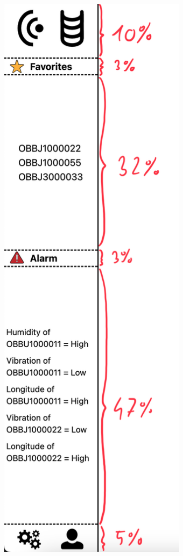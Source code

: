 \documentclass[
    headings=optiontotocandhead,%
    twoside,
    numbers=noenddot,%
    12pt, %
    titlepage, %
    parskip=full, %
    listof=leveldown, 
    numbers=noenddot, %
    a4paper,DIV=14,
    BCOR=15mm,
]{scrbook}
\let\origfigure=\figure
\let\endorigfigure=\endfigure
\renewenvironment{figure}[1][]{%
   \origfigure[H]
}{%
   \endorigfigure
}
\begin{document}
\begin{figure}
\centering
\includegraphics[width=0.8\textwidth,height=\textheight]{img/Gekle/SidebarPercentages.png}
\caption{Aufteilung der Sidebar in Prozenten}
\end{figure}
\end{document}
